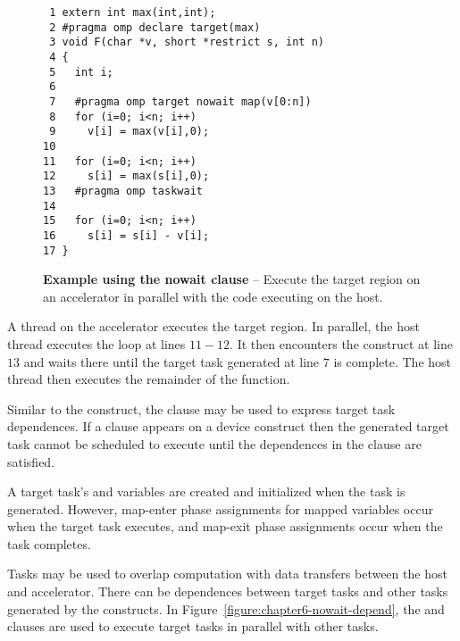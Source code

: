 \begin{figure*}[!tb]
\begin{verbatim}
 1 extern int max(int,int);
 2 #pragma omp declare target(max)
 3 void F(char *v, short *restrict s, int n)
 4 {
 5   int i;
 6 
 7   #pragma omp target nowait map(v[0:n])
 8   for (i=0; i<n; i++)
 9     v[i] = max(v[i],0);
10 
11   for (i=0; i<n; i++)
12     s[i] = max(s[i],0);
13   #pragma omp taskwait
14 
15   for (i=0; i<n; i++)
16     s[i] = s[i] - v[i];
17 }
\end{verbatim}
\caption{ \textbf {Example using the nowait clause } -- \small
          Execute the target region on an accelerator in 
          parallel with the code executing on the host.
         }
\label{figure:chapter6-nowait-v2}
\end{figure*}

A thread on the accelerator executes the target region.  In parallel, the host
thread executes the loop at lines $11-12$.  It then encounters the
 construct at line $13$ and waits there until the target task
generated at line $7$ is complete.  The host thread then executes the
remainder of the function.

Similar to the  construct, the  clause may be
used to express target task dependences.  If a  clause appears on
a device construct then the generated target task cannot be scheduled to
execute until the dependences in the clause are satisfied.

A target task's  and  variables are created and initialized
when the task is generated.  However, map-enter phase assignments for mapped
variables occur when the target task executes, and map-exit phase assignments
occur when the task completes. 

Tasks may be used to overlap computation with data transfers between the host
and accelerator.  There can be dependences between target tasks and other tasks
generated by the  constructs.  In
Figure~\ref{figure:chapter6-nowait-depend}, the  and
 clauses are used to execute target tasks in parallel with other tasks.

